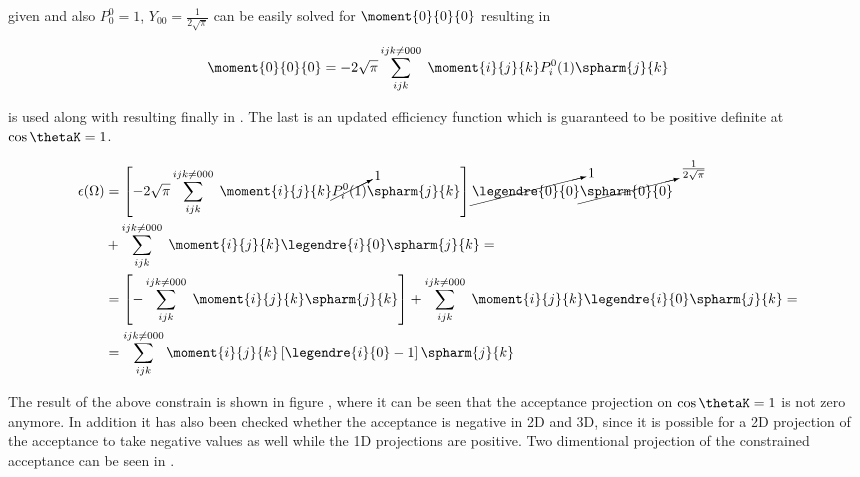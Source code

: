 \noindent given  and also $P_{0}^{0}=1$,  $Y_{00} = \frac{1}{2\sqrt{\pi}}$  can be 
easily solved for $\moment{0}{0}{0}$ resulting in 

\begin{center}
\begin{equation}
  \moment{0}{0}{0} = -2\sqrt{\pi} \sum_{ijk}^{ijk\neq 000} \; \moment{i}{j}{k} P_i^0(1) \spharm{j}{k}
  \label{eff_constr_mom}
\end{equation}
\end{center}

\noindent {} is used along with  resulting finally in . 
The last is an updated efficiency function which is guaranteed to be positive definite at $\cos\thetaK=1$. 

\begin{center}
\begin{align}
  \epsilon(\Omega) &= \left[-2\sqrt{\pi} \sum_{ijk}^{ijk\neq 000} \; \moment{i}{j}{k} \cancelto{1}{P_i^0(1)} \spharm{j}{k} \right] \cancelto{1}{\legendre{0}{0}} \cancelto{\frac{1}{2\sqrt{\pi}}}{\spharm{0}{0}} \nonumber \\ 
                   &+ \sum_{ijk}^{ijk\neq 000} \; \moment{i}{j}{k} \legendre{i}{0} \spharm{j}{k} = \nonumber \\
                   &= \left[- \sum_{ijk}^{ijk\neq 000} \; \moment{i}{j}{k} \spharm{j}{k} \right] + \sum_{ijk}^{ijk\neq 000} \; \moment{i}{j}{k} \legendre{i}{0} \spharm{j}{k} = \nonumber\\
                   &= \sum_{ijk}^{ijk\neq 000} \moment{i}{j}{k} \left[ \legendre{i}{0} - 1 \right]\spharm{j}{k}
  \label{eff_func_final}
\end{align}
\end{center}

\noindent The result of the above constrain is shown in figure , where it can be seen that the acceptance projection on $\cos\thetaK=1$
is not zero anymore. In addition it has also been checked whether the acceptance is negative in 2D and 3D, since it is possible for a 2D
projection of the acceptance to take negative values as well while the 1D projections are positive. Two dimentional projection of the constrained acceptance 
can be seen in .

